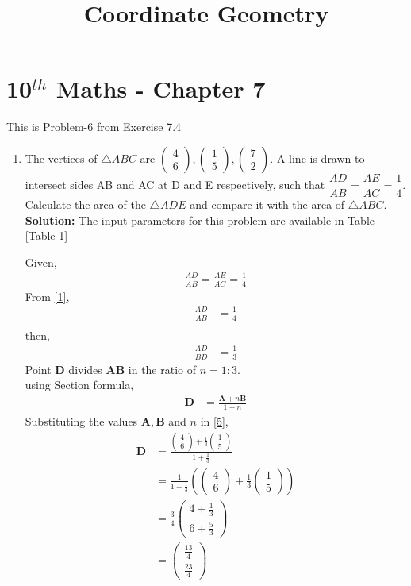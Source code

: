 \documentclass[12pt]{article}
\providecommand{\brak}[1]{\ensuremath{\left(#1\right)}}
\newcommand{\solution}{\noindent \textbf{Solution: }}
\newcommand{\myvec}[1]{\ensuremath{\begin{pmatrix}#1\end{pmatrix}}}
\let\vec\mathbf
\begin{document}
\begin{center}
\title{\textbf{Coordinate Geometry}}
\date{\vspace{-5ex}} %
\maketitle
\end{center}
\setcounter{page}{1}
\section*{10$^{th}$ Maths - Chapter 7}
This is Problem-6 from Exercise 7.4
\begin{enumerate}
\item The vertices of $\triangle ABC$ are $\myvec{4 \\ 6}, \myvec{1\\5}, \myvec{7\\2}$. A line is drawn to intersect sides AB and AC at D and E respectively, such that $\dfrac{AD}{AB}=\dfrac{AE}{AC}=\dfrac{1}{4}$. Calculate the area of the $\triangle ADE$ and compare it with the area of $\triangle ABC$.\\
\solution The input parameters for this problem are available in Table \eqref{Table-1}
\begin{table}[ht!]\centering

\caption{}
\label{Table-1}	
\end{table}


Given,
\begin{align}
\frac{AD}{AB}=\frac{AE}{AC}=\frac{1}{4}\label{1}
\end{align}
From \eqref{1},
\begin{align}
\frac{AD}{AB} &=\frac{1}{4}\\
\end{align}
then,
\begin{align}
\frac{AD}{BD} &=\frac{1}{3}
\end{align}
Point $\vec{D}$ divides $\vec{A}\vec{B}$ in the ratio of $n = 1:3$.\\
using Section formula,
\begin{align}
\vec{D} &=\frac{\vec{A}+n\vec{B}}{1+n}\label{5}
\end{align}
Substituting the values $\vec{A},\vec{B}$ and $n$ in \eqref{5},
\begin{align}
\vec{D} &=\frac{{\myvec{4\\6}+\frac{1}{3}\myvec{1\\5}}}{1+\frac{1}{3}}\\
	&=\frac{1}{1+\frac{1}{3}}\brak{{\myvec{4\\6}+\frac{1}{3}\myvec{1\\5}}} \\
	&=\frac{3}{4}\myvec{4+\frac{1}{3}\\6+\frac{5}{3}}\\
	&=\myvec{\frac{13}{4}\\ \frac{23}{4}}
\end{align}


\end{enumerate}
\end{document}

